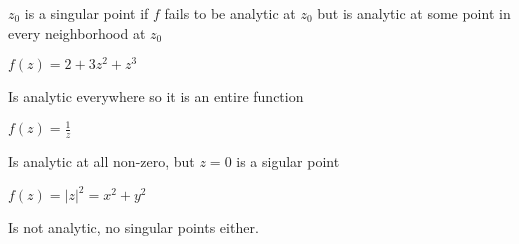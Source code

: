 \begin{definition}
   $z_0$ is a singular point if $f$ fails to be analytic at $z_0$ but is analytic at some point in every neighborhood at $z_0$
\end{definition}
\begin{eg}
   $f(z) = 2 + 3z^2 + z^3$

   Is analytic everywhere so it is an entire function
\end{eg}
\begin{eg}
   $f(z) = \frac{1}{z}$

   Is analytic at all non-zero, but $z = 0$ is a sigular point
\end{eg}
\begin{eg}
  $f(z) = |z|^2 = x^2 + y^2$

  Is not analytic, no singular points either.
\end{eg}













